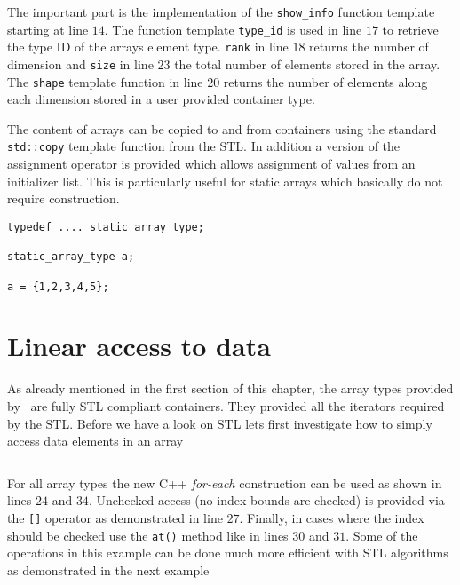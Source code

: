 \inputminted[fontsize=\small,
             linenos,
             firstline=24,
             frame=lines,
             label=examples/array\_inquery.cpp]
{cpp}{../examples/array_inquery.cpp}
The important part is the implementation of the {\tt show\_info} function
template starting at line $14$. The function template {\tt type\_id} is used in
line $17$ to retrieve the type ID of the arrays element type. {\tt rank} in line
$18$ returns the number of dimension and {\tt size} in line $23$ the total
number of elements stored in the array. 
The {\tt shape} template function in line $20$ returns the number of elements
along each dimension stored in a user provided container type.

The content of arrays can be copied to and from containers using the standard 
{\tt std::copy} template function from the STL. In addition a version of the
assignment operator is provided which allows assignment of values from an
initializer list. This is particularly useful for static arrays which basically
do not require construction. 
\begin{verbatim}
typedef .... static_array_type; 

static_array_type a;

a = {1,2,3,4,5};
\end{verbatim}

\section{Linear access to data}
As already mentioned in the first section of this chapter, the array types
provided by \libpnicore\ are fully STL compliant containers. They provided all
the iterators required by the STL. 
Before we have a look on STL lets first investigate how to simply access data
elements in an array

\inputminted[fontsize=\small,
             linenos,
             firstline=24,
             frame=lines,
             label=examples/array\_linear\_access.cpp]
{cpp}{../examples/array_linear_access.cpp}
For all array types the new C++ {\em for-each} construction can be used as shown
in lines $24$ and $34$. Unchecked access (no index bounds are checked) is
provided via the {\tt []} operator as demonstrated in line $27$. Finally, in
cases where the index should be checked use the {\tt at()} method like in lines 
$30$ and $31$.
Some of the operations in this example can be done much more efficient with STL
algorithms as demonstrated in the next example

